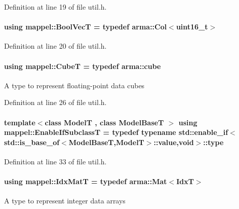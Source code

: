 Definition at line 19 of file util.\+h.

\paragraph[{\texorpdfstring{Bool\+VecT}{BoolVecT}}]{\setlength{\rightskip}{0pt plus 5cm}using {\bf mappel\+::\+Bool\+VecT} = typedef arma\+::\+Col$<$uint16\+\_\+t$>$}\hypertarget{namespacemappel_a167d761ecce3cafb6f98c00c16bdb523}{}\label{namespacemappel_a167d761ecce3cafb6f98c00c16bdb523}


Definition at line 20 of file util.\+h.

\paragraph[{\texorpdfstring{CubeT}{CubeT}}]{\setlength{\rightskip}{0pt plus 5cm}using {\bf mappel\+::\+CubeT} = typedef arma\+::cube}\hypertarget{namespacemappel_ab2afab4e6c8805e83946670d882768c2}{}\label{namespacemappel_ab2afab4e6c8805e83946670d882768c2}
A type to represent floating-\/point data cubes 

Definition at line 26 of file util.\+h.

\paragraph[{\texorpdfstring{Enable\+If\+SubclassT}{EnableIfSubclassT}}]{\setlength{\rightskip}{0pt plus 5cm}template$<$class ModelT , class Model\+BaseT $>$ using {\bf mappel\+::\+Enable\+If\+SubclassT} = typedef typename std\+::enable\+\_\+if$<$std\+::is\+\_\+base\+\_\+of$<$Model\+BaseT,ModelT$>$\+::value,void$>$\+::type}\hypertarget{namespacemappel_a5ee1448a35c267ee0bc4b8f1a2e09615}{}\label{namespacemappel_a5ee1448a35c267ee0bc4b8f1a2e09615}


Definition at line 33 of file util.\+h.

\paragraph[{\texorpdfstring{Idx\+MatT}{IdxMatT}}]{\setlength{\rightskip}{0pt plus 5cm}using {\bf mappel\+::\+Idx\+MatT} = typedef arma\+::\+Mat$<${\bf IdxT}$>$}\hypertarget{namespacemappel_a08989eafa9aeb1a4c3ec773614297d0d}{}\label{namespacemappel_a08989eafa9aeb1a4c3ec773614297d0d}
A type to represent integer data arrays 

